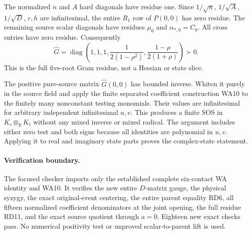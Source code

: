 The normalized $n$ and $A$ hard diagonals have residue one. Since
$1/\sqrt n$, $1/\sqrt A$, $1/\sqrt D$, $r,h$ are infinitesimal,
the entire $R_1$ row of $P(0,0)$ has zero residue. The remaining
source scalar diagonals have residues $\mu_0$ and $\alpha_{*,0}=C_0$.
All cross entries have zero residue. Consequently
\[
 \overline{\widehat G}
   =\operatorname{diag}\left(1,1,1,
              \frac1{2(1-\rho^2)},
              \frac{1-\rho}{2(1+\rho)}\right)\succ0. \tag{RD11}
\]
This is the full five-root Gram residue, not a Hessian or state slice.

The positive pure-source matrix $\widehat G(0,0)$ has bounded inverse.
Whiten it purely in the source field and apply the finite separated
coefficient construction WA10 to the finitely many nonconstant
testing monomials. Their values are infinitesimal for arbitrary
independent infinitesimal $u,v$. This produces a finite SOS in
$K_c\otimes_{\mathbb R}K_t$ without any mixed inverse or mixed radical.
The argument includes either zero test and both signs because all
identities are polynomial in $u,v$. Applying it to real and imaginary
state parts proves the complex-state statement.

\paragraph{Verification boundary.}
The focused checker imports only the established complete six-contact
WA identity and WA10. It verifies the new entire $D$-matrix gauge,
the physical syzygy, the exact original-event centering, the entire
parent equality RD6, all fifteen normalized coefficient denominators
at the joint opening, the full residue RD11, and the exact source
quotient through $a=0$. Eighteen new exact checks pass. No numerical
positivity test or unproved scalar-to-parent lift is used.
